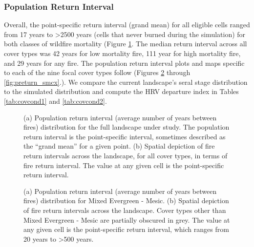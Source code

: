 \subsubsection{Population Return Interval}
Overall, the point-specific return interval (grand mean) for all eligible cells ranged from 17 years to \textgreater 2500 years (cells that never burned during the simulation) for both classes of wildfire mortality (Figure \ref{fig:preturn}. The median return interval across all cover types was 42 years for low mortality fire, 111 year for high mortality fire, and 29 years for any fire. The population return interval plots and maps specific to each of the nine focal cover types follow (Figures \ref{fig:preturn_megm} through \ref{fig:preturn_smcx}.). We compare the current landscape's seral stage distribution to the simulated distribution and compute the HRV departure index in Tables \ref{tab:covcond1} and \ref{tab:covcond2}.
\begin{figure}[!htbp]
  \centering
  \qquad
  \caption{(a) Population return interval (average number of years between fires) distribution for the full landscape under study. The population return interval is the point-specific interval, sometimes described as the ``grand mean'' for a given point. (b) Spatial depiction of fire return intervals across the landscape, for all cover types, in terms of fire return interval. The value at any given cell is the point-specific return interval.}
  \label{fig:preturn}
\end{figure}


\begin{figure}[!htbp]
  \centering
  \caption{(a) Population return interval (average number of years between fires) distribution for Mixed Evergreen - Mesic. (b) Spatial depiction of fire return intervals across the landscape. Cover types other than Mixed Evergreen - Mesic are partially obscured in grey. The value at any given cell is the point-specific return interval, which ranges from 20 years to \textgreater 500 years.}
    \label{fig:preturn_megm}
\end{figure}

